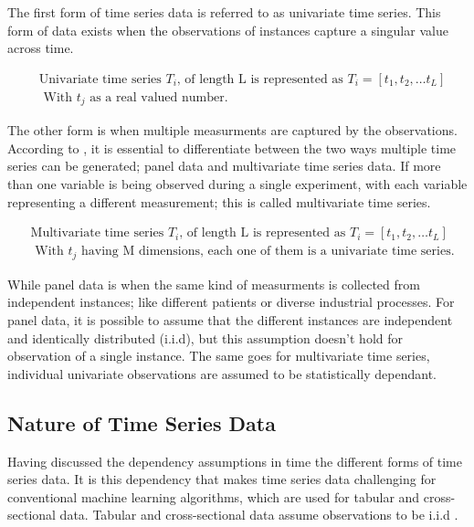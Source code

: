 The first form of time series data is referred to as univariate time series.
This form of data exists when the observations of instances capture a singular value across time.
\begin{definition}
    \begin{align*} 
        & \text{Univariate time series } T_{i} \text{, of length L is represented as } T_{i} = [t_{1},t_{2}, \ldots t_{L}] \\
        & \text{ With } t_{j} \text{ as a real valued number.}
    \end{align*}
\end{definition}

The other form is when multiple measurments are captured by the observations.
According to \cite{loning2019sktime}, it is essential to differentiate between the two ways multiple time series can be generated; panel data and multivariate time series data.
If more than one variable is being observed during a single experiment, with each variable representing a different measurement; this is called multivariate time series.
\begin{definition}
    \begin{align*} 
        & \text{Multivariate time series } T_{i} \text{, of length L is represented as } T_{i} = [t_{1},t_{2}, \ldots t_{L}] \\
        & \text{ With } t_{j} \text{  having M dimensions, each one of them is a univariate time series.}
    \end{align*}
\end{definition}
While panel data is when the same kind of measurments is collected from independent instances; like different patients or diverse industrial processes.
For panel data, it is possible to assume that the different instances are independent and identically distributed (i.i.d), but this assumption doesn't hold for observation of a single instance.
The same goes for multivariate time series, individual univariate observations are assumed to be statistically dependant.

\subsection{Nature of Time Series Data}
\label{NatureOfTimeSeriesData}
Having discussed the dependency assumptions in time the different forms of time series data.
It is this dependency that makes time series data challenging for conventional machine learning algorithms, which are used for tabular and cross-sectional data.
Tabular and cross-sectional data assume observations to be  i.i.d \cite{loning2019sktime}.

